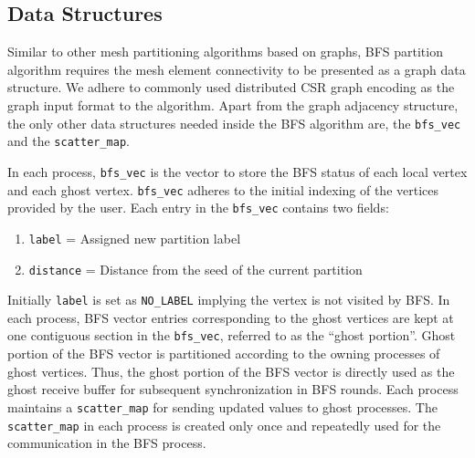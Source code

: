 \documentclass[conference]{IEEEtran}
\begin{document}
\subsection{Data Structures}
Similar to other mesh partitioning algorithms based on graphs, BFS partition algorithm requires the mesh element connectivity to be presented as a graph data structure. We adhere to commonly used distributed CSR graph encoding as the graph input format to the algorithm. Apart from the graph adjacency structure, the only other data structures needed inside the BFS algorithm are, the \verb|bfs_vec| and the \verb|scatter_map|.
\par
In each process, \verb|bfs_vec| is the vector to store the BFS status of each local vertex and each ghost vertex. \verb|bfs_vec| adheres to the initial indexing of the vertices provided by the user. Each entry in the \verb|bfs_vec| contains two fields: 
\begin{enumerate}
    \item \verb|label| = Assigned new partition label
    \item \verb|distance| = Distance from the seed of the current partition
\end{enumerate}
\par
Initially \verb|label| is set as \verb|NO_LABEL| implying the vertex is not visited by BFS. In each process, BFS vector entries corresponding to the ghost vertices are kept at one contiguous section in the \verb|bfs_vec|, referred to as the ``ghost portion''. Ghost portion of the BFS vector is partitioned according to the owning processes of ghost vertices. Thus, the ghost portion of the BFS vector is directly used as the ghost receive buffer for subsequent synchronization in BFS rounds. Each process maintains a \verb|scatter_map| for sending updated values to ghost processes. The \verb|scatter_map| in each process is created only once and repeatedly used for the communication in the BFS process.

\end{document}
